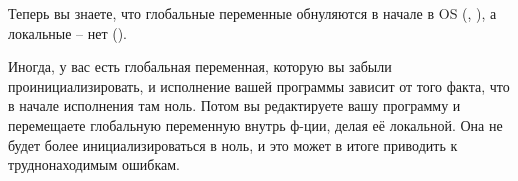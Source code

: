 
Теперь вы знаете, что глобальные переменные обнуляются в начале в \ac{OS}
(, ),
а локальные -- нет ().

Иногда, у вас есть глобальная переменная, которую вы забыли проинициализировать, и исполнение вашей программы
зависит от того факта, что в начале исполнения там ноль.
Потом вы редактируете вашу программу и перемещаете глобальную переменную внутрь ф-ции, делая её локальной.
Она не будет более инициализироваться в ноль, и это может в итоге приводить к труднонаходимым ошибкам.

